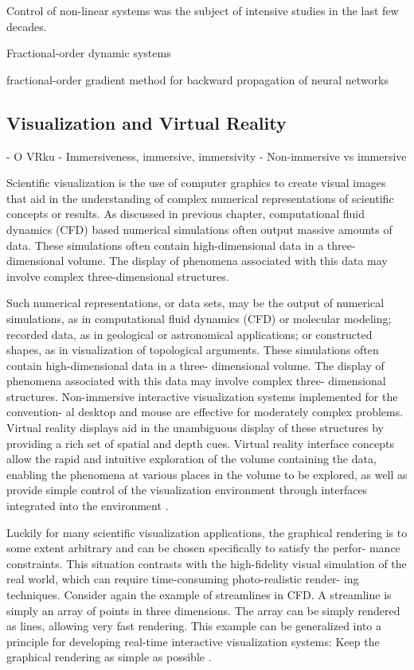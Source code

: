 Control of non-linear systems was the subject of intensive studies in the last few decades.


Fractional-order dynamic systems

fractional-order gradient method for backward propagation of neural networks \citep{Sheng2019}

\subsection{Visualization and Virtual Reality}

- O VRku
- Immersiveness, immersive, immersivity
- Non-immersive vs immersive

Scientific visualization is the use of computer graphics to create visual images that aid in the understanding of complex numerical representations of scientific concepts or results. As discussed in previous chapter, computational fluid dynamics (CFD) based numerical simulations often output massive amounts of data. These simulations often contain high-dimensional data in a three-dimensional volume. The display of phenomena associated with this data may involve complex three-dimensional structures.


 Such numerical representations, or data sets, may be the output of numerical simulations, as in computational fluid dynamics (CFD) or molecular modeling; recorded data, as in geological or astronomical applications; or constructed shapes, as in visualization of topological arguments. These simulations often contain high-dimensional data in a three- dimensional volume. The display of phenomena associated with this data may involve complex three- dimensional structures. Non-immersive interactive visualization systems implemented for the convention- al desktop and mouse are effective for moderately complex problems. Virtual reality displays aid in the unambiguous display of these structures by providing a rich set of spatial and depth cues. Virtual reality interface concepts allow the rapid and intuitive exploration of the volume containing the data, enabling the phenomena at various places in the volume to be explored, as well as provide simple control of the visualization environment through interfaces integrated into the environment \citep{Bryson1996}.

Luckily for many scientific visualization applications, the graphical rendering is to some extent arbitrary and can be chosen specifically to satisfy the perfor- mance constraints. This situation contrasts with the high-fidelity visual simulation of the real world, which can require time-consuming photo-realistic render- ing techniques. Consider again the example of streamlines in CFD. A streamline is simply an array of points in three dimensions. The array can be simply rendered as lines, allowing very fast rendering. This example can be generalized into a principle for developing real-time interactive visualization systems: Keep the graphical rendering as simple as possible \citep{Bryson1996}.

